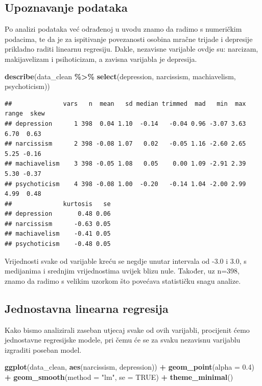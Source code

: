 \documentclass[
]{article}
\newenvironment{Shaded}{\begin{snugshade}}{\end{snugshade}}
\newcommand{\AttributeTok}[1]{\textcolor[rgb]{0.13,0.29,0.53}{#1}}
\newcommand{\ConstantTok}[1]{\textcolor[rgb]{0.56,0.35,0.01}{#1}}
\newcommand{\FloatTok}[1]{\textcolor[rgb]{0.00,0.00,0.81}{#1}}
\newcommand{\FunctionTok}[1]{\textcolor[rgb]{0.13,0.29,0.53}{\textbf{#1}}}
\newcommand{\NormalTok}[1]{#1}
\newcommand{\SpecialCharTok}[1]{\textcolor[rgb]{0.81,0.36,0.00}{\textbf{#1}}}
\newcommand{\StringTok}[1]{\textcolor[rgb]{0.31,0.60,0.02}{#1}}
\begin{document}
\subsection{Upoznavanje podataka}\label{upoznavanje-podataka}

Po analizi podataka već odrađenoj u uvodu znamo da radimo s numeričkim
podacima, te da je za ispitivanje povezanosti osobina mračne trijade i
depresije prikladno raditi linearnu regresiju. Dakle, nezavisne
varijable ovdje su: narcizam, makijavelizam i psihoticizam, a zavisna
varijabla je depresija.

\begin{Shaded}
\begin{Highlighting}[]
\FunctionTok{describe}\NormalTok{(data\_clean }\SpecialCharTok{\%\textgreater{}\%}
  \FunctionTok{select}\NormalTok{(depression, narcissism, machiavelism, psychoticism))}
\end{Highlighting}
\end{Shaded}

\begin{verbatim}
##              vars   n  mean   sd median trimmed  mad   min  max range  skew
## depression      1 398  0.04 1.10  -0.14   -0.04 0.96 -3.07 3.63  6.70  0.63
## narcissism      2 398 -0.08 1.07   0.02   -0.05 1.16 -2.60 2.65  5.25 -0.16
## machiavelism    3 398 -0.05 1.08   0.05    0.00 1.09 -2.91 2.39  5.30 -0.37
## psychoticism    4 398 -0.08 1.00  -0.20   -0.14 1.04 -2.00 2.99  4.99  0.48
##              kurtosis   se
## depression       0.48 0.06
## narcissism      -0.63 0.05
## machiavelism    -0.41 0.05
## psychoticism    -0.48 0.05
\end{verbatim}

Vrijednosti svake od varijable kreću se negdje unutar intervala od -3.0
i 3.0, s medijanima i srednjim vrijednostima uvijek blizu nule. Također,
uz n=398, znamo da radimo s velikim uzorkom što povećava statističku
snagu analize.

\subsection{Jednostavna linearna
regresija}\label{jednostavna-linearna-regresija}

Kako bismo analizirali zaseban utjecaj svake od ovih varijabli,
procijenit ćemo jednostavne regresijske modele, pri čemu će se za svaku
nezavisnu varijablu izgraditi poseban model.

\begin{Shaded}
\begin{Highlighting}[]
\FunctionTok{ggplot}\NormalTok{(data\_clean, }\FunctionTok{aes}\NormalTok{(narcissism, depression)) }\SpecialCharTok{+}
  \FunctionTok{geom\_point}\NormalTok{(}\AttributeTok{alpha =} \FloatTok{0.4}\NormalTok{) }\SpecialCharTok{+}
  \FunctionTok{geom\_smooth}\NormalTok{(}\AttributeTok{method =} \StringTok{"lm"}\NormalTok{, }\AttributeTok{se =} \ConstantTok{TRUE}\NormalTok{) }\SpecialCharTok{+}
  \FunctionTok{theme\_minimal}\NormalTok{()}
\end{Highlighting}
\end{Shaded}
\end{document}
